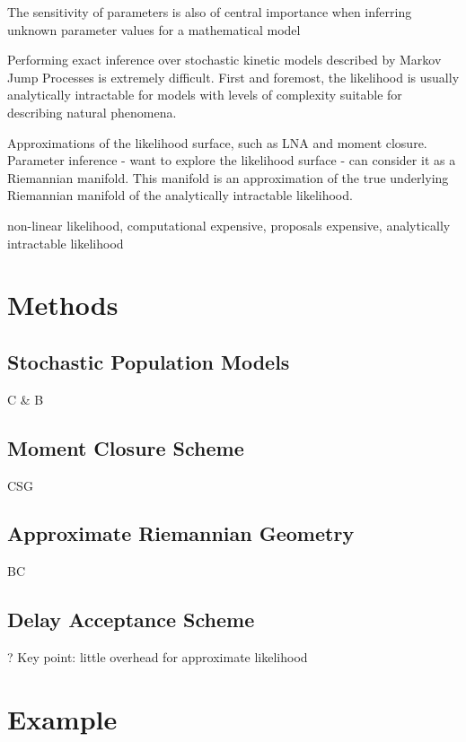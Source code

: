 \documentclass{pnastwo}
\begin{document}
\begin{article}
The sensitivity of parameters is also of central importance when inferring unknown parameter values for a mathematical model

Performing exact inference over stochastic kinetic models described by Markov Jump Processes is extremely difficult.  First and foremost, the likelihood is usually analytically intractable for models with levels of complexity suitable for describing natural phenomena.

Approximations of the likelihood surface, such as LNA and moment closure.  Parameter inference - want to explore the likelihood surface - can consider it as a Riemannian manifold.  This manifold is an approximation of the true underlying Riemannian manifold of the analytically intractable likelihood.

non-linear likelihood, computational expensive, proposals expensive, analytically intractable likelihood



\section{Methods}

\subsection{Stochastic Population Models}

C \& B

\subsection{Moment Closure Scheme}

CSG

\subsection{Approximate Riemannian Geometry}
BC

\subsection{Delay Acceptance Scheme}

?
Key point: little overhead for approximate likelihood


\section{Example}


\end{article}
\end{document}
